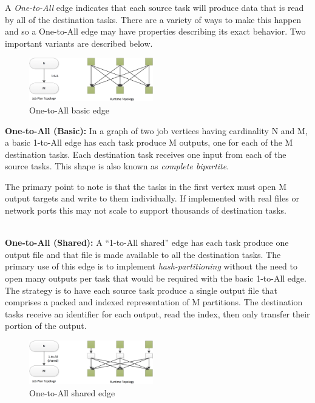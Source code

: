 \documentclass[twocolumn]{article}
\begin{document}
A \textit{One-to-All} edge indicates that each source task will produce data that is read by all of the destination tasks.  
There are a variety of ways to make this happen and so a One-to-All edge may have properties describing its exact behavior.
Two important variants are described below.
\begin{figure}[htb]
        \centering
        \includegraphics[width=0.48\textwidth]{one-to-all}
        \caption{One-to-All basic edge}
        \label{one-to-one}
\end{figure}
\noindent
\textbf{One-to-All (Basic):} 
In a graph of two job vertices having cardinality N and M, a basic 1-to-All edge has each task produce M outputs, one for each of the M destination tasks.  Each destination task receives one input from each of the source tasks.
This shape is also known as \textit{complete bipartite}.

The primary point to note is that the tasks in the first vertex must open M output targets and write to them individually.  If implemented with real files or network ports this may not scale to support thousands of destination tasks.  

\noindent
\\
\textbf{One-to-All (Shared):} 
A “1-to-All shared” edge has each task produce one output file and that file is made available to all the destination tasks.  The primary use of this edge is to implement \textit{hash-partitioning} without the need to open many outputs per task that would be required with the basic 1-to-All edge.  The strategy is to have each source task produce a single output file that comprises a packed and indexed representation of M partitions.  The destination tasks receive an identifier for each output, read the index,  then only transfer their portion of the output.

\begin{figure}[htb]
        \centering
        \includegraphics[width=0.48\textwidth]{one-to-all-shared}
        \caption{One-to-All shared edge}
        \label{one-to-one}
\end{figure}
\end{document}

